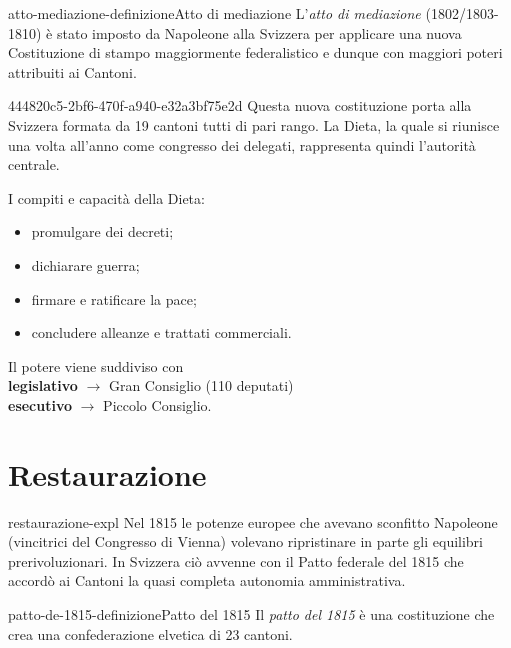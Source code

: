 \documentclass[preview]{standalone}
\begin{document}
\begin{snippetdefinition}{atto-mediazione-definizione}{Atto di mediazione}
    L'\textit{atto di mediazione} (1802/1803-1810) è stato imposto da Napoleone alla Svizzera per
    applicare una nuova Costituzione di stampo maggiormente federalistico e
    dunque con maggiori poteri attribuiti ai Cantoni.
\end{snippetdefinition}

\begin{snippet}{444820c5-2bf6-470f-a940-e32a3bf75e2d}
    Questa nuova costituzione porta alla Svizzera formata da 19 cantoni tutti di pari rango.
    La Dieta, la quale si riunisce una volta all'anno come congresso dei delegati,
    rappresenta quindi l'autorità centrale.

    I compiti e capacità della Dieta:
    \begin{itemize}
        \item promulgare dei decreti;
        \item dichiarare guerra;
        \item firmare e ratificare la pace;
        \item concludere alleanze e trattati commerciali.
    \end{itemize}

    Il potere viene suddiviso con \\
    \textbf{legislativo} \(\rightarrow\) Gran Consiglio (110 deputati) \\
    \textbf{esecutivo} \(\rightarrow\) Piccolo Consiglio.
\end{snippet}


\section{Restaurazione}

\begin{snippet}{restaurazione-expl}
    Nel 1815 le potenze europee che avevano sconfitto Napoleone (vincitrici del Congresso di Vienna)
    volevano ripristinare in parte gli equilibri prerivoluzionari.
    In Svizzera ciò avvenne con il Patto federale del 1815 che
    accordò ai Cantoni la quasi completa autonomia amministrativa.
\end{snippet}

\begin{snippetdefinition}{patto-de-1815-definizione}{Patto del 1815}
    Il \textit{patto del 1815} è una costituzione che crea una confederazione elvetica di 23 cantoni.
\end{snippetdefinition}
\end{document}
